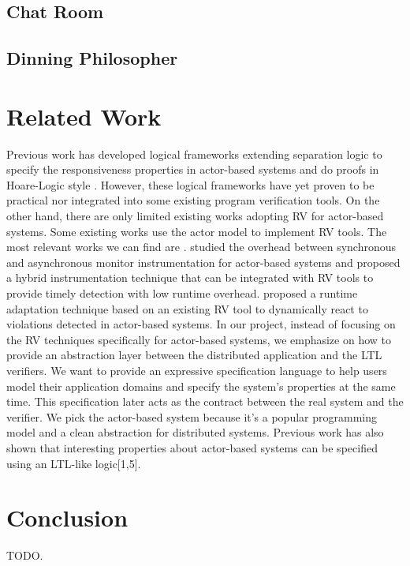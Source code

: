 \documentclass[format=acmsmall, nonacm=true, review=true, screen=true]{acmart}
\begin{document}
\subsection{Chat Room}

\subsection{Dinning Philosopher}

\section{Related Work}

Previous work has developed logical frameworks extending separation logic to specify the responsiveness properties in actor-based systems and do proofs in Hoare-Logic style \cite{actorservice, parthasarathy2018modular}.
However, these logical frameworks have yet proven to be practical nor integrated into some existing program verification tools.
On the other hand, there are only limited existing works adopting RV for actor-based systems.
Some existing works \cite{shafiei2020actor,lavery2017actor} use the actor model to implement RV tools.
The most relevant works we can find are \cite{cassar2015synchronous,cassar2015runtime}.
\cite{cassar2015synchronous} studied the overhead between synchronous and asynchronous monitor instrumentation for actor-based systems and proposed a hybrid instrumentation technique that can be  integrated with RV tools to provide timely detection with low runtime overhead.
\cite{cassar2015runtime} proposed a runtime adaptation technique based on an existing RV tool to dynamically react to violations detected in actor-based systems.
In our project, instead of focusing on the RV techniques specifically for actor-based systems, we emphasize on how to provide an abstraction layer between the distributed application and the LTL verifiers.
We want to provide an expressive specification language to help users model their application domains and specify the system's properties at the same time. This specification later acts as the contract between the real system and the verifier.
We pick the actor-based system because it's a popular programming model and a clean abstraction for distributed systems.
Previous work has also shown that interesting properties about actor-based systems can be specified using an LTL-like logic[1,5].

\section{Conclusion}

TODO.



\end{document}
